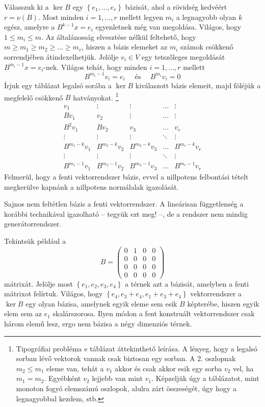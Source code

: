\documentclass[9pt, a4paper, showtrims]{memoir}
\theoremstyle{plain}
\theoremstyle{remark}
\theoremstyle{definition}
\begin{document}
Válasszuk ki a $\ker B$ egy 
$\left\{ e_1,\dots,e_r \right\}$ bázisát, 
ahol a rövidség kedvéért $r=\nu\left( B \right)$.
Most minden $i=1,\dots,r$ mellett legyen $m_i$ a legnagyobb olyan $k$ egész, amelyre a
$B^{k-1}x=e_i$ egyenletnek még van megoldása.
Világos, hogy $1\leq m_i\leq m$.
Az általánosság elvesztése nélkül feltehető, hogy 
$m\geq m_1\geq m_2\geq \dots \geq m_r$, hiszen a bázis elemeket az $m_i$ számok
csökkenő sorrendjében átindexelhetjük.
Jelölje $v_i\in V$ egy tetszőleges megoldását $B^{m_i-1}x=e_i$-nek.
Világos tehát, hogy minden $i=1,\dots,r$ mellett
\[
    B^{m_i-1}v_i=e_i \quad\text{ és }\quad B^{m_i}v_i=0
\]
Írjuk egy táblázat legalsó sorába a $\ker B$ kiválaszott bázis elemeit,
majd föléjük a megfelelő csökkenő $B$ hatványokat.%
\footnote{Tipográfiai probléma e táblázat áttekinthető leírása.
    A lényeg, hogy a legalsó sorban lévő vektorok vannak csak biztosan egy sorban. A 2. oszlopnak $m_2\leq m_1$
eleme van, tehát a $v_1$ akkor és csak akkor esik egy sorba $v_2$ vel, ha $m_1=m_2$. Egyébként $v_2$ lejjebb van mint $v_1$. Képzeljük úgy a táblázatot, mint monoton fogyó elemszámú oszlopok, alulra zárt összeségét, úgy hogy a legnagyobbal kezdem, stb.}
\[
    \begin{matrix}
        v_1         & \vdots       & \vdots       & \dots  & \vdots\\
        Bv_1        & v_2          & \vdots       & \dots  & \vdots\\
        B^2v_1       & Bv_2         & v_3          & \dots  & v_r\\
        \vdots       & \vdots       & \vdots       & \ddots & \vdots \\
        B^{m_1-k}v_1 & B^{m_2-k}v_2 & B^{m_3-k}v_3 & \dots  & B^{m_r-k}v_r\\
        \vdots       & \vdots       & \vdots       & \ddots & \vdots\\
        B^{m_1-1}v_1 & B^{m_2-1}v_2 & B^{m_3-1}v_3 & \dots  & B^{m_r-1}v_r
    \end{matrix}
\]
Felmerül, hogy a fenti vektorrendszer bázis, evvel a nillpotens felbontási tételt megkerülve 
kapnánk a nillpotens normálalak igazolását.

Sajnos nem feltétlen bázis a fenti vektorrendszer.
A lineárisan függetlenség a korábbi technikával igazolható -- tegyük ezt meg! --, de a rendszer nem mindig
generátorrendszer.

Tekintsük például a
\[
    B=
    \begin{pmatrix}
        0&1&0&0\\
        0&0&0&0\\
        0&0&0&0\\
        0&0&0&0
    \end{pmatrix}
\]
mátrixát. 
Jelölje most $\left\{ e_1,e_2,e_3,e_4 \right\}$ a térnek azt  a bázisát, amelyben 
a fenti mátrixot felírtuk.
Világos, hogy $\left\{ e_4,e_3+e_4,e_1+e_3+e_4 \right\}$ vektorrendszer a $\ker B$ egy olyan bázisa,
amelynek egyik eleme sem esik $B$ képterébe, hiszen egyik elem sem az $e_1$ skalárszorosa.
Ilyen módon a fent konstruált vektorrendszer csak három elemű lesz, ergo nem bázisa a négy 
dimenziós térnek.
\end{document}
